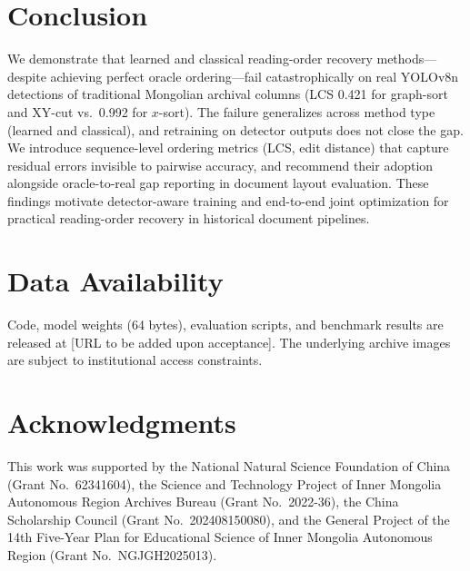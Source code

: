 \documentclass[5p,times,twocolumn]{elsarticle}
\begin{document}
\section{Conclusion}
We demonstrate that learned and classical reading-order recovery methods---despite achieving perfect oracle ordering---fail catastrophically on real YOLOv8n detections of traditional Mongolian archival columns (LCS 0.421 for graph-sort and XY-cut vs.\ 0.992 for $x$-sort). The failure generalizes across method type (learned and classical), and retraining on detector outputs does not close the gap. We introduce sequence-level ordering metrics (LCS, edit distance) that capture residual errors invisible to pairwise accuracy, and recommend their adoption alongside oracle-to-real gap reporting in document layout evaluation. These findings motivate detector-aware training and end-to-end joint optimization for practical reading-order recovery in historical document pipelines.

\section*{Data Availability}
Code, model weights (64 bytes), evaluation scripts, and benchmark results are released at [URL to be added upon acceptance]. The underlying archive images are subject to institutional access constraints.

\section*{Acknowledgments}
This work was supported by the National Natural Science Foundation of China (Grant No.\ 62341604), the Science and Technology Project of Inner Mongolia Autonomous Region Archives Bureau (Grant No.\ 2022-36), the China Scholarship Council (Grant No.\ 202408150080), and the General Project of the 14th Five-Year Plan for Educational Science of Inner Mongolia Autonomous Region (Grant No.\ NGJGH2025013).
\end{document}
